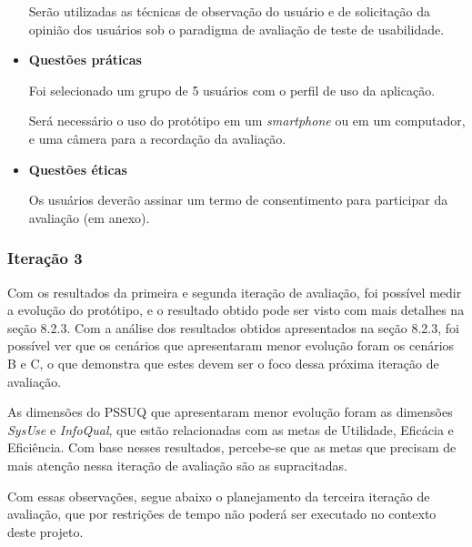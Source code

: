 \begin{itemize}
	      \subitem 
		Serão utilizadas as técnicas de observação do usuário e de solicitação da opinião dos usuários
		sob o paradigma de avaliação de teste de usabilidade.
	      
	   \item \textbf{Questões práticas}
	      
	      \subitem Foi selecionado um grupo de 5 usuários com o perfil de uso da aplicação.
	      
	      \subitem Será necessário o uso do protótipo em um \textit{smartphone} ou em um computador, e uma câmera para 
	      a recordação da avaliação.
	      
	   \item \textbf{Questões éticas}
	      
	      \subitem 
		Os usuários deverão assinar um termo de consentimento para participar da avaliação (em anexo).
	      
	  \end{itemize}
	  
	\subsubsection{Iteração 3}
	  
	  Com os resultados da primeira e segunda iteração de avaliação, foi possível medir a evolução do protótipo, e o resultado 
	  obtido pode ser visto com mais detalhes na seção 8.2.3. Com a análise dos resultados obtidos apresentados na seção 8.2.3,
	  foi possível ver que os cenários que apresentaram menor evolução foram os cenários B e C, o que demonstra que estes devem 
	  ser o foco dessa próxima iteração de avaliação.
	    
	  As dimensões do PSSUQ que apresentaram menor evolução foram as dimensões 
	  \textit{SysUse} e \textit{InfoQual}, que estão relacionadas com as metas de Utilidade, Eficácia e Eficiência. Com base 
	  nesses resultados, percebe-se que as metas que precisam de mais atenção nessa iteração de avaliação são as supracitadas.
	  
	  Com essas observações, segue abaixo o planejamento da terceira iteração de avaliação, que por restrições de tempo não poderá
	  ser executado no contexto deste projeto.
	  
